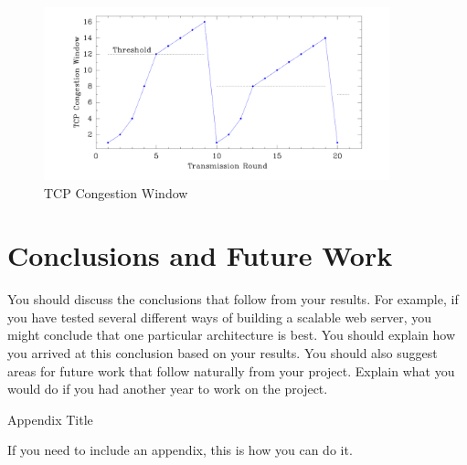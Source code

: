 \documentclass[11pt,onecolumn]{IEEEtran}
\begin{document}
\begin{figure}
\centering
\includegraphics[height=5cm]{tcp}
\caption{TCP Congestion Window}
\label{tcp}
\end{figure}

\section{Conclusions and Future Work}

You should discuss the conclusions that follow from your results.
For example, if you have tested several different ways of building
a scalable web server, you might conclude that one particular architecture
is best.  You should explain how you arrived at this conclusion based
on your results.  You should also suggest areas for future work that
follow naturally from your project.  Explain what you would do if you
had another year to work on the project.





\appendix

\begin{center}
Appendix Title
\end{center}

If you need to include an appendix, this is how you can do it.
\end{document}
